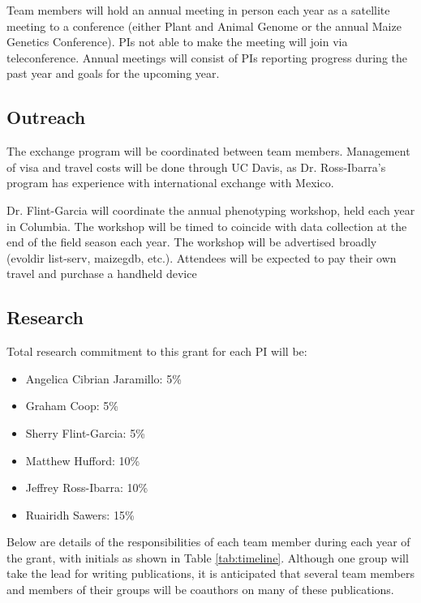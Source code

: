 Team members will hold an annual meeting in person each year as a satellite meeting to a conference (either Plant and Animal Genome or the annual Maize Genetics Conference).  PIs not able to make the meeting will join via teleconference.  Annual meetings will consist of PIs reporting progress during the past year and goals for the upcoming year. 

\subsection*{Outreach} 

The exchange program will be coordinated between team members.  Management of visa and travel costs will be done through UC Davis, as Dr. Ross-Ibarra's program has experience with international exchange with Mexico.  

Dr. Flint-Garcia will coordinate the annual phenotyping workshop, held each year in Columbia.  The workshop will be timed to coincide with data collection at the end of the field season each year. The workshop will be advertised broadly (evoldir list-serv, maizegdb, etc.).  Attendees will be expected to pay their own travel and purchase a handheld device

\subsection*{Research}

Total research commitment to this grant for each PI will be:
\begin{itemize}
\item Angelica Cibrian Jaramillo: 5\%
\item Graham Coop: 5\%
\item Sherry Flint-Garcia: 5\%
\item Matthew Hufford: 10\%
\item Jeffrey Ross-Ibarra: 10\%
\item Ruairidh Sawers: 15\%
\end{itemize} 
Below are details of the responsibilities of each team member during each year of the grant, with initials as shown in Table \ref{tab:timeline}. Although one group will take the lead for writing publications, it is anticipated that several team members and members of their groups will be coauthors on many of these publications.
\clearpage

